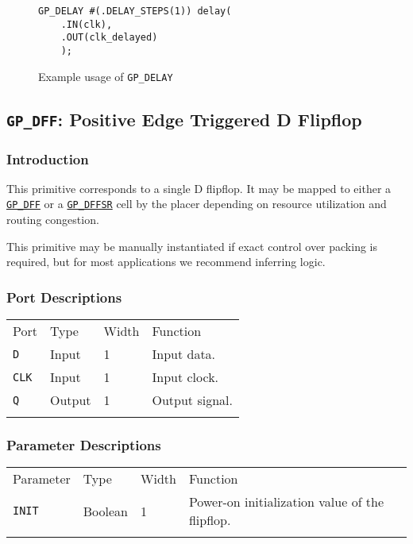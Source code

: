 \documentclass[11pt]{article}
\newcommand{\tokenstyle}[1]{\texttt{#1}}
\newcommand{\whenstyle}[1]{{\fontseries{sb}\selectfont#1}}
\newcommand{\tokenref}[2]{\hyperref[#2]{\tokenstyle{#1}}}
\newcommand{\thinhline}{\Xhline{1\arrayrulewidth}}
\newcommand{\thickhline}{\Xhline{2.5\arrayrulewidth}}
\begin{document}
\begin{figure}[h]
\begin{lstlisting}
GP_DELAY #(.DELAY_STEPS(1)) delay(
	.IN(clk),
	.OUT(clk_delayed)
	);
\end{lstlisting}
\caption{Example usage of \tokenstyle{GP\_DELAY}}
\label{gp-delay-example}
\end{figure}


\pagebreak
\subsection{\tokenstyle{GP\_DFF}: Positive Edge Triggered D Flipflop}
\label{gp-dff}

\subsubsection{Introduction}
This primitive corresponds to a single D flipflop. It may be mapped to either a \tokenref{GP\_DFF}{gp-dff} or a
\tokenref{GP\_DFFSR}{gp-dffsr} cell by the placer depending on resource utilization and routing congestion.

This primitive may be manually instantiated if exact control over packing is required, but for most applications we
recommend inferring logic.

\subsubsection{Port Descriptions}

\begin{tabularx}{\textwidth}{lllX}
\thinhline
\whenstyle{Port} & \whenstyle{Type} & \whenstyle{Width} & \whenstyle{Function} \\
\thickhline
\tokenstyle{D} & Input & 1 & Input data. \\
\thinhline
\tokenstyle{CLK} & Input & 1 & Input clock. \\
\thinhline
\tokenstyle{Q} & Output & 1 & Output signal. \\
\thinhline
\end{tabularx}

\subsubsection{Parameter Descriptions}

\begin{tabularx}{\textwidth}{lllX}
\thinhline
\whenstyle{Parameter} & \whenstyle{Type} & \whenstyle{Width} & \whenstyle{Function} \\
\thickhline
\tokenstyle{INIT} & Boolean & 1 & Power-on initialization value of the flipflop. \\
\thinhline
\end{tabularx}
\end{document}
